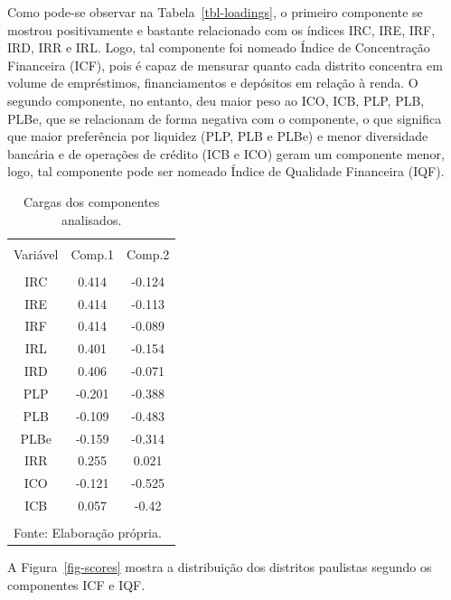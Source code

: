 \documentclass[a4paper,12pt]{article}
\begin{document}
Como pode-se observar na Tabela~\ref{tbl-loadings}, o primeiro
componente se mostrou positivamente e bastante relacionado com os
índices IRC, IRE, IRF, IRD, IRR e IRL. Logo, tal componente foi nomeado
Índice de Concentração Financeira (ICF), pois é capaz de mensurar quanto
cada distrito concentra em volume de empréstimos, financiamentos e
depósitos em relação à renda. O segundo componente, no entanto, deu
maior peso ao ICO, ICB, PLP, PLB, PLBe, que se relacionam de forma
negativa com o componente, o que significa que maior preferência por
liquidez (PLP, PLB e PLBe) e menor diversidade bancária e de operações
de crédito (ICB e ICO) geram um componente menor, logo, tal componente
pode ser nomeado Índice de Qualidade Financeira (IQF).

\hypertarget{tbl-loadings}{}
\begin{table}[!htbp] \centering 
  \caption{\label{tbl-loadings}Cargas dos componentes analisados. } 
  \label{} 
\begin{tabular}{@{\extracolsep{5pt}} ccc} 
\\[-1.8ex]\hline 
\hline \\[-1.8ex] 
Variável & Comp.1 & Comp.2 \\ 
\hline \\[-1.8ex] 
IRC & 0.414 & -0.124 \\ 
IRE & 0.414 & -0.113 \\ 
IRF & 0.414 & -0.089 \\ 
IRL & 0.401 & -0.154 \\ 
IRD & 0.406 & -0.071 \\ 
PLP & -0.201 & -0.388 \\ 
PLB & -0.109 & -0.483 \\ 
PLBe & -0.159 & -0.314 \\ 
IRR & 0.255 & 0.021 \\ 
ICO & -0.121 & -0.525 \\ 
ICB & 0.057 & -0.42 \\ 
\hline \\[-1.8ex] 
\multicolumn{3}{l}{Fonte: Elaboração própria.} \\ 
\end{tabular} 
\end{table}

A Figura~\ref{fig-scores} mostra a distribuição dos distritos paulistas
segundo os componentes ICF e IQF.
\end{document}
